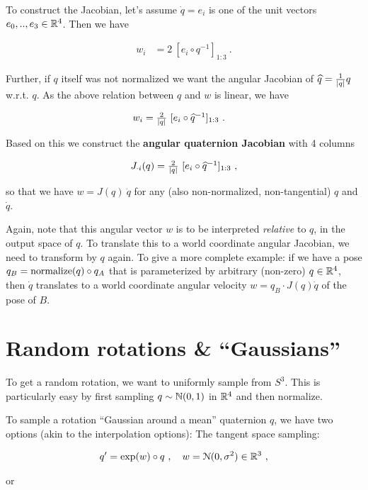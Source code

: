 To construct the Jacobian, let's assume $\dot q=e_i$ is one of the unit vectors
$e_0,..,e_3\in{\mathbb{R}}^4$. Then we have

\begin{align}
w_i
&= 2~ [e_i\circ q^{-1}]_{1:3} ~.
\end{align}

Further, if $q$ itself was not normalized we want the angular Jacobian
of $\widehat q = \textstyle\frac1{|q|} q$ w.r.t. $q$. As the above relation between $q$
and $w$ is linear, we have

\begin{align}
w_i
&= \textstyle\frac2{|q|}~ [e_i \circ \widehat q^{-1}]_{1:3} ~.
\end{align}

Based on this we construct the \textbf{angular quaternion Jacobian}
with 4 columns

\begin{align}
J_{\cdot i}(q) = \textstyle\frac2{|q|}~ [e_i \circ \widehat q^{-1}]_{1:3} ~,
\end{align}

so that we have $w = J(q)~ \dot q$ for any (also non-normalized, non-tangential) $q$
and $\dot q$.

Again, note that this angular vector $w$ is to be
interpreted \emph{relative} to $q$, in the output space of $q$. To
translate this to a world coordinate angular Jacobian, we need to
transform by $q$ again. To give a more complete example: if we have a
pose $q_B = \text{normalize}(q) \circ q_A$ that is parameterized by arbitrary (non-zero)
$q\in{\mathbb{R}}^4$, then $\dot
q$ translates to a world coordinate angular velocity $w = q_B \cdot
J(q) \dot q$ of the pose of $B$.


\section{Random rotations \& ``Gaussians''}

To get a random rotation, we want to uniformly sample from $S^3$. This
is particularly easy by first sampling $q\sim{\mathbb{N}}(0,1)$ in ${\mathbb{R}}^4$
and then normalize.

To sample a rotation ``Gaussian around a mean'' quaternion $q$, we
have two options (akin to the interpolation options): The tangent
space sampling:

\begin{align}
q' = \exp(w) \circ q~,\quad w = {\cal N}(0,\sigma^2) \in {\mathbb{R}}^3 ~,
\end{align}

or

